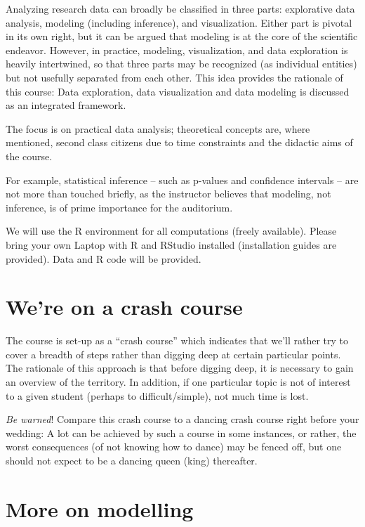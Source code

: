 \documentclass[
  letterpaper,
  DIV=11,
  numbers=noendperiod]{scrreprt}
\theoremstyle{definition}
\theoremstyle{definition}
\theoremstyle{remark}
\begin{document}
Analyzing research data can broadly be classified in three parts:
explorative data analysis, modeling (including inference), and
visualization. Either part is pivotal in its own right, but it can be
argued that modeling is at the core of the scientific endeavor. However,
in practice, modeling, visualization, and data exploration is heavily
intertwined, so that three parts may be recognized (as individual
entities) but not usefully separated from each other. This idea provides
the rationale of this course: Data exploration, data visualization and
data modeling is discussed as an integrated framework.

The focus is on practical data analysis; theoretical concepts are, where
mentioned, second class citizens due to time constraints and the
didactic aims of the course.

For example, statistical inference -- such as p-values and confidence
intervals -- are not more than touched briefly, as the instructor
believes that modeling, not inference, is of prime importance for the
auditorium.

We will use the R environment for all computations (freely available).
Please bring your own Laptop with R and RStudio installed (installation
guides are provided). Data and R code will be provided.

\hypertarget{were-on-a-crash-course}{%
\section*{We're on a crash course}\label{were-on-a-crash-course}}

The course is set-up as a ``crash course'' which indicates that we'll
rather try to cover a breadth of steps rather than digging deep at
certain particular points. The rationale of this approach is that before
digging deep, it is necessary to gain an overview of the territory. In
addition, if one particular topic is not of interest to a given student
(perhaps to difficult/simple), not much time is lost.

\emph{Be warned}! Compare this crash course to a dancing crash course
right before your wedding: A lot can be achieved by such a course in
some instances, or rather, the worst consequences (of not knowing how to
dance) may be fenced off, but one should not expect to be a dancing
queen (king) thereafter.

\hypertarget{more-on-modelling}{%
\section*{More on modelling}\label{more-on-modelling}}
\end{document}
